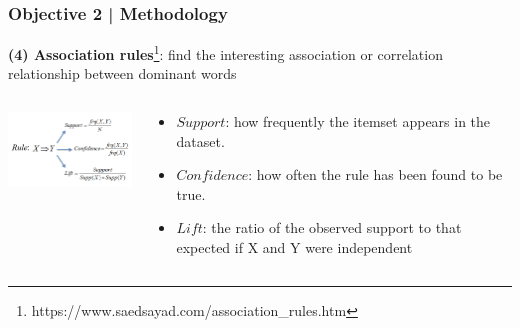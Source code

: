 \documentclass{beamer}
\begin{document}
\begin{frame}
\frametitle{Objective 2 | Methodology}
\textbf{(4) Association rules}\footnote{https://www.saedsayad.com/association\_rules.htm}: find the interesting association or correlation relationship between dominant words \\


\begin{columns}
	\begin{column}{.55\textwidth}
		\includegraphics[width=50mm]{AR_1.png}
	\end{column}
	\begin{column}{.55\textwidth}
	\begin{itemize}
		\item $Support$: how frequently the itemset appears in the dataset.
		
		
		\item $Confidence$: how often the rule has been found to be true.
		
		
		\item $Lift$: the ratio of the observed support to that expected if X and Y were independent
		
	\end{itemize}
	\end{column}
\end{columns}


\end{frame}
\end{document}
